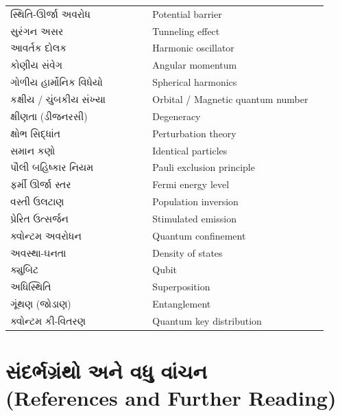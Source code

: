 \begin{longtable}{@{}p{0.42\linewidth}p{0.52\linewidth}@{}}
સ્થિતિ-ઊર્જા અવરોધ & Potential barrier \\
સુરંગન અસર & Tunneling effect \\
આવર્તક દોલક & Harmonic oscillator \\
કોણીય સંવેગ & Angular momentum \\
ગોળીય હાર્મોનિક વિધેયો & Spherical harmonics \\
કક્ષીય / ચુંબકીય સંખ્યા & Orbital / Magnetic quantum number \\
ક્ષીણતા (ડીજનરસી) & Degeneracy \\
ક્ષોભ સિદ્ધાંત & Perturbation theory \\
સમાન કણો & Identical particles \\
પૌલી બહિષ્કાર નિયમ & Pauli exclusion principle \\
ફર્મી ઊર્જા સ્તર & Fermi energy level \\
વસ્તી ઉલટાણ & Population inversion \\
પ્રેરિત ઉત્સર્જન & Stimulated emission \\
ક્વોન્ટમ અવરોધન & Quantum confinement \\
અવસ્થા-ઘનતા & Density of states \\
ક્યુબિટ & Qubit \\
અધિસ્થિતિ & Superposition \\
ગૂંથણ (જોડાણ) & Entanglement \\
ક્વોન્ટમ કી-વિતરણ & Quantum key distribution \\
\bottomrule
\end{longtable}

\chapter[પરિશિષ્ટ E : સંદર્ભગ્રંથો]{સંદર્ભગ્રંથો અને વધુ વાંચન\\{\large (References and Further Reading)}}

